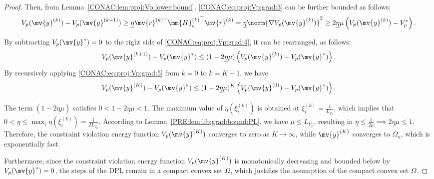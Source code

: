 \begin{proof}
  Then, from Lemma~\ref{CONAC:lem:proj:Vp:lower:bound}, \eqref{CONAC:eq:proj:Vp:grad:3} can be further bounded as follows:
  \begin{equation}
    \label{CONAC:eq:proj:Vp:grad:4}
    V_p(\mv{y}^{(k)})
    -
    V_p(\mv{y}^{(k+1)})
    \ge
    \underline{\eta}
    \mv{r}^{(k)\top}{\mm{H}_c^{(k)}}^\top\mv{r}^{(k)}
    =
    \underline{\eta}
    \norm{\nabla V_p(\mv{y}^{(k)})}^2
    \ge
    2\underline{\eta}\mu
    \left(
      V_p(\mv{y}^{(k)})
      -
      V_p^*
    \right)
    .
  \end{equation}

  By subtracting $V_p(\mv{y}^*)=0$ to the right side of \eqref{CONAC:eq:proj:Vp:grad:4}, it can be rearranged, as follows:
  \begin{equation}
    \label{CONAC:eq:proj:Vp:grad:5}
    V_p(\mv{y}^{(k+1)}) - V_p(\mv{y}^*)
    \le
    (1-2\underline{\eta}\mu)
    \left(
      V_p(\mv{y}^{(k)}) - V_p(\mv{y}^*)
    \right) 
    .
  \end{equation}
  By recursively applying \eqref{CONAC:eq:proj:Vp:grad:5} from $k=0$ to $k=K-1$, we have
  \begin{equation}
    \label{CONAC:eq:proj:Vp:grad:6}
    V_p(\mv{y}^{(K)}) - V_p(\mv{y}^*)
    \le
    (1-2\underline{\eta}\mu)^K
    \left(
      V_p(\mv{y}^{(0)}) - V_p(\mv{y}^*)
    \right)
    .
  \end{equation}

  The term $(1-2\underline{\eta}\mu)$ satisfies $0<1-2\underline{\eta}\mu<1$.
  The maximum value of $\eta(\xi_i^{(k)})$ is obtained at $\xi_i^{(k)}=\frac{1}{L_{V_p}}$, which implies that $0<\underline{\eta}\le\max_{i}\eta(\xi_i^{(k)})=\frac{1}{2L_{V_p}}$.
  According to Lemma~\ref{PRE:lem:lib:grad:bound:PL}, we have $\mu\le L_{V_p}$, resulting in $\underline{\eta}\le\frac{1}{2\mu}\implies 2\underline{\eta}\mu\le 1$.
  Therefore, the constraint violation energy function $V_p(\mv{y}^{(K)})$ converges to zero as $K\to\infty$, while $\mv{y}^{(K)}$ converges to $\Omega_u$, which is exponentially fast.

  Furthermore, since the constraint violation energy function $V_p(\mv{y}^{(K)})$ is monotonically decreasing and bounded below by $V_p(\mv{y}^*)=0$, the steps of the DPL remain in a compact convex set $\Omega$, which justifies the assumption of the compact convex set $\Omega$.

\end{proof}

